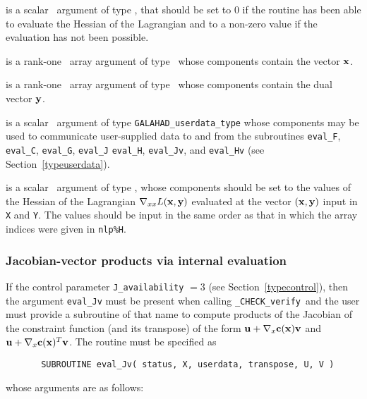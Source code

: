 \documentclass{galahad}
\newcommand{\packagename}{CHECK}
\newcommand{\fullpackagename}{\libraryname\_\packagename}
\newcommand{\solver}{{\tt \fullpackagename\_verify}}
\begin{document}
\begin{description}

 is a scalar \intentout\ argument of type \integer,
that should be set to 0 if the routine has been able to evaluate
the Hessian of the Lagrangian 
and to a non-zero value if the evaluation has not been possible.

 is a rank-one \intentin\ array argument of type \realdp\
whose components contain the vector ${\mathbf{x}}$.

 is a rank-one \intentin\ array argument of type \realdp\
whose components contain the dual vector ${\mathbf{y}}$.

 is a scalar \intentinout\ argument of type 
{\tt GALAHAD\_userdata\_type} whose components may be used
to communicate user-supplied data to and from the
subroutines {\tt eval\_F}, {\tt eval\_C}, {\tt eval\_G}, {\tt eval\_J}
{\tt eval\_H}, {\tt eval\_Jv}, and {\tt eval\_Hv} 
(see Section~\ref{typeuserdata}). 

 is a scalar \intentout\ argument of type \realdp,
whose components should be set to the values of the Hessian
of the Lagrangian $\nabla_{xx} L({\mathbf{x}},{\mathbf{y}})$
evaluated at the vector $({\mathbf{x}},{\mathbf{y}})$ input in {\tt X} and {\tt Y}. The values should
be input in the same order as that in which the array indices were
given in {\tt nlp\%H}.

\end{description}


\subsubsection{Jacobian-vector products via internal evaluation\label{jvfv}}

If the control parameter {\tt J\_availability} $=3$ (see
Section~\ref{typecontrol}), then the argument {\tt eval\_Jv} must be
present when calling \solver\ and the
user must provide a subroutine of that name to compute
products of the Jacobian of the constraint function (and its transpose)
of the form ${\mathbf{u}} + \nabla_{x} {\mathbf{c}}({\mathbf{x}}){\mathbf{v}}$ and
${\mathbf{u}} + \nabla_{x} {\mathbf{c}}({\mathbf{x}})^T{\mathbf{v}}$.
The routine must be specified as

\def\baselinestretch{0.8}
{\tt \begin{verbatim}
       SUBROUTINE eval_Jv( status, X, userdata, transpose, U, V ) \end{verbatim} }
\def\baselinestretch{1.0}
\noindent whose arguments are as follows:
\end{document}

